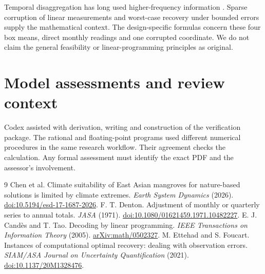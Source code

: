\documentclass[11pt]{article}
\begin{document}
Temporal disaggregation has long used higher-frequency information \cite{denton}. Sparse corruption of linear measurements \cite{candes} and worst-case recovery under bounded errors \cite{ettehad} supply the mathematical context. The design-specific formulas concern these four box means, direct monthly readings and one corrupted coordinate. We do not claim the general feasibility or linear-programming principles as original.
\section*{Model assessments and review context}
Codex assisted with derivation, writing and construction of the verification package. The rational and floating-point programs used different numerical procedures in the same research workflow. Their agreement checks the calculation. Any formal assessment must identify the exact PDF and the assessor's involvement.
\begin{thebibliography}{9}
 Chen et al. Climate suitability of East Asian mangroves for nature-based solutions is limited by climate extremes. \emph{Earth System Dynamics} (2026). \href{https://doi.org/10.5194/esd-17-1687-2026}{doi:10.5194/esd-17-1687-2026}.
 F. T. Denton. Adjustment of monthly or quarterly series to annual totals. \emph{JASA} (1971). \href{https://doi.org/10.1080/01621459.1971.10482227}{doi:10.1080/01621459.1971.10482227}.
 E. J. Cand\`es and T. Tao. Decoding by linear programming. \emph{IEEE Transactions on Information Theory} (2005). \href{https://arxiv.org/abs/math/0502327}{arXiv:math/0502327}.
 M. Ettehad and S. Foucart. Instances of computational optimal recovery: dealing with observation errors. \emph{SIAM/ASA Journal on Uncertainty Quantification} (2021). \href{https://doi.org/10.1137/20M1328476}{doi:10.1137/20M1328476}.
\end{thebibliography}
\end{document}
